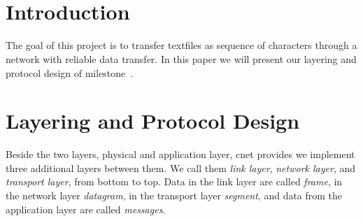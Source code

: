 
\title{\Large \lecture \\ \textbf{\normalsize \assignment}}
\author{\authors}

\setlength \headheight{25pt}
\fancyhead[L]{\authors}




\maketitle

\section{Introduction}
The goal of this project is to transfer textfiles as sequence of characters through a network with reliable data transfer. In this paper we will present our layering and protocol design of milestone~.

\section{Layering and Protocol Design}

Beside the two layers, physical and application layer, cnet provides we implement three additional layers between them. We call them \emph{link layer}, \emph{network layer}, and \emph{transport layer}, from bottom to top. Data in the link layer are called \emph{frame}, in the network layer \emph{datagram}, in the transport layer \emph{segment}, and data from the application layer are called \emph{messages}.


